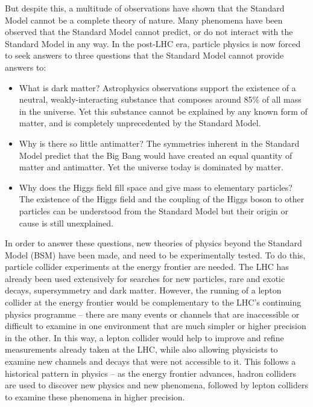 But despite this, a multitude of observations have shown that the Standard Model cannot be a complete theory of nature. Many phenomena have been observed that the Standard Model cannot predict, or do not interact with the Standard Model in any way. In the post-LHC era, particle physics is now forced to seek answers to three questions that the Standard Model cannot provide answers to:

\begin{itemize}
	\item What is dark matter? Astrophysics observations support the existence of a neutral, weakly-interacting substance that composes around 85\% of all mass in the universe. Yet this substance cannot be explained by any known form of matter, and is completely unprecedented by the Standard Model.
	\item Why is there so little antimatter? The symmetries inherent in the Standard Model predict that the Big Bang would have created an equal quantity of matter and antimatter. Yet the universe today is dominated by matter.
	\item Why does the Higgs field fill space and give mass to elementary particles? The existence of the Higgs field and the coupling of the Higgs boson to other particles can be understood from the Standard Model but their origin or cause is still unexplained.
\end{itemize}

In order to answer these questions, new theories of physics beyond the Standard Model (\acrshort{BSM}) have been made, and need to be experimentally tested. To do this, particle collider experiments at the energy frontier are needed. The \acrfull{LHC} has already been used extensively for searches for new particles, rare and exotic decays, supersymmetry and dark matter. However, the running of a lepton collider at the energy frontier would be complementary to the \acrlong{LHC}'s continuing physics programme -- there are many events or channels that are inaccessible or difficult to examine in one environment that are much simpler or higher precision in the other. In this way, a lepton collider would help to improve and refine measurements already taken at the \acrshort{LHC}, while also allowing physicists to examine new channels and decays that were not accessible to it. This follows a historical pattern in physics -- as the energy frontier advances, hadron colliders are used to discover new physics and new phenomena, followed by lepton colliders to examine these phenomena in higher precision.

